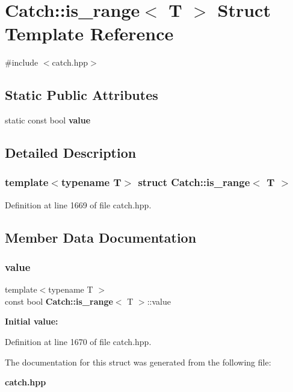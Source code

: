 \section{Catch\+::is\+\_\+range$<$ T $>$ Struct Template Reference}
\label{struct_catch_1_1is__range}


{\ttfamily \#include $<$catch.\+hpp$>$}

\subsection*{Static Public Attributes}
\begin{DoxyCompactItemize}
\item 
static const bool \textbf{ value}
\end{DoxyCompactItemize}


\subsection{Detailed Description}
\subsubsection*{template$<$typename T$>$\newline
struct Catch\+::is\+\_\+range$<$ T $>$}



Definition at line 1669 of file catch.\+hpp.



\subsection{Member Data Documentation}
\mbox{\label{struct_catch_1_1is__range_afaec39e819c3956829cbbd00feba11be}} 
\subsubsection{value}
{\footnotesize\ttfamily template$<$typename T $>$ \\
const bool \textbf{ Catch\+::is\+\_\+range}$<$ T $>$\+::value\hspace{0.3cm}{\ttfamily [static]}}

{\bfseries Initial value\+:}
\begin{DoxyCode}{0}
\DoxyCodeLine{=}

\end{DoxyCode}


Definition at line 1670 of file catch.\+hpp.



The documentation for this struct was generated from the following file\+:\begin{DoxyCompactItemize}
\item 
\textbf{ catch.\+hpp}\end{DoxyCompactItemize}
